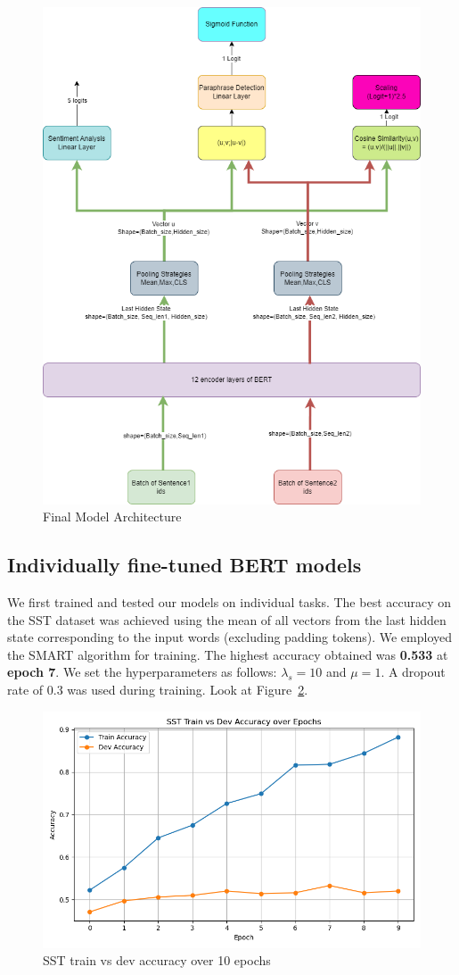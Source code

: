 \begin{figure}[H]
    \centering
    \includegraphics[width=0.8\linewidth]{Figures/Final Model Architecture.png}
    \caption{Final Model Architecture}
    \label{fig:Final_Model_Architecture}
\end{figure}


\subsection{Individually fine-tuned BERT models}
\label{subsec:Individually fine-tuned BERT models}
We first trained and tested our models on individual tasks. The best accuracy on the SST dataset was achieved using the mean of all vectors from the last hidden state corresponding to the input words (excluding padding tokens). We employed the SMART algorithm for training. The highest accuracy obtained was \textbf{0.533} at \textbf{epoch 7}. We set the hyperparameters as follows: \(\lambda_s = 10\) and \(\mu = 1\). A dropout rate of 0.3 was used during training. Look at Figure~\ref{fig:sst_accuracy}.
\begin{figure}[H]
    \centering
    \includegraphics[width=0.8\linewidth]{Figures/sst_accuracy_plot.png}
    \caption{SST train vs dev accuracy over 10 epochs}
    \label{fig:sst_accuracy}
\end{figure}

